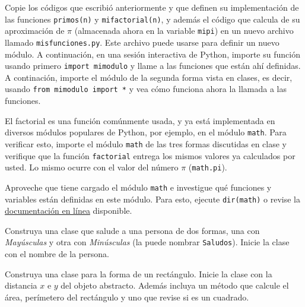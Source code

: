 \documentclass[11pt]{exam}
\begin{document}
\firstpageheadrule
\runningheadrule
{}
\cfoot{ }
\begin{flushleft}
\vspace{0.2in}

\vspace{0.25cm}
\end{flushleft}

\begin{questions}
\item Copie los códigos que escribió anteriormente y que definen su implementación de  las funciones \texttt{primos(n)} y \texttt{mifactorial(n)}, y además el código que calcula de su aproximación de $\pi$ (almacenada ahora en la variable \texttt{mipi}) en un nuevo archivo llamado \texttt{misfunciones.py}. Este archivo puede usarse para definir un nuevo módulo. A continuación, en una sesión interactiva de Python, importe su función usando primero \texttt{import mimodulo} y llame a las funciones que están ahí definidas. A continación, importe el módulo de la segunda forma vista en clases, es decir, usando \texttt{from mimodulo import *} y vea cómo funciona ahora la llamada a las funciones.

\item El factorial es una función comúnmente usada, y ya está implementada en diversos módulos populares de Python, por ejemplo, en el módulo \texttt{math}. Para verificar esto, importe el módulo \texttt{math} de las tres formas discutidas en clase y verifique que la función \texttt{factorial} entrega los mismos valores ya calculados por usted. Lo mismo ocurre con el valor del número $\pi$ (\texttt{math.pi}). 

\item Aproveche que tiene cargado el módulo \texttt{math} e investigue qué funciones y variables están definidas en este módulo. Para esto, ejecute \texttt{dir(math)} o revise la \href{https://docs.python.org/2/library/math.html}{documentaci\'on en l\'inea} disponible.

\item Construya una clase que salude a una persona de dos formas, 
      una con \textit{Mayúsculas} y otra con \textit{Minúsculas} (la puede nombrar \texttt{Saludos}). 
      Inicie la clase con el nombre de la persona. 

\item Construya una clase para la forma de un rectángulo. Inicie la 
      clase con la distancia $x$ e $y$ del objeto abstracto. Además incluya un método
      que calcule el área, perímetero del rectángulo y uno que revise si es un cuadrado.


\end{questions}
\end{document}
